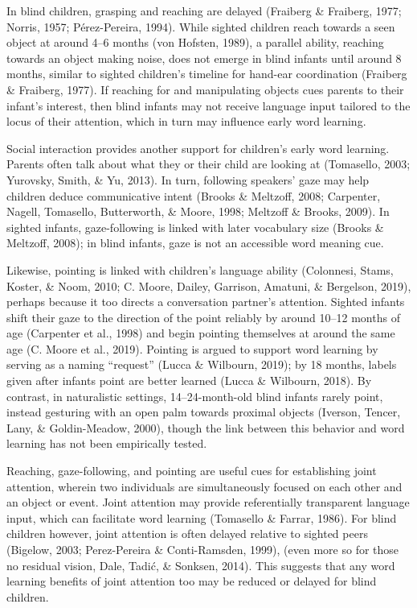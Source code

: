 \documentclass[
  man,floatsintext]{apa6}
\begin{document}
In blind children, grasping and reaching are delayed (Fraiberg \& Fraiberg, 1977; Norris, 1957; Pérez-Pereira, 1994). While sighted children reach towards a seen object at around 4--6 months (von Hofsten, 1989), a parallel ability, reaching towards an object making noise, does not emerge in blind infants until around 8 months, similar to sighted children's timeline for hand-ear coordination (Fraiberg \& Fraiberg, 1977). If reaching for and manipulating objects cues parents to their infant's interest, then blind infants may not receive language input tailored to the locus of their attention, which in turn may influence early word learning.

Social interaction provides another support for children's early word learning. Parents often talk about what they or their child are looking at (Tomasello, 2003; Yurovsky, Smith, \& Yu, 2013). In turn, following speakers' gaze may help children deduce communicative intent (Brooks \& Meltzoff, 2008; Carpenter, Nagell, Tomasello, Butterworth, \& Moore, 1998; Meltzoff \& Brooks, 2009). In sighted infants, gaze-following is linked with later vocabulary size (Brooks \& Meltzoff, 2008); in blind infants, gaze is not an accessible word meaning cue.

Likewise, pointing is linked with children's language ability (Colonnesi, Stams, Koster, \& Noom, 2010; C. Moore, Dailey, Garrison, Amatuni, \& Bergelson, 2019), perhaps because it too directs a conversation partner's attention. Sighted infants shift their gaze to the direction of the point reliably by around 10--12 months of age (Carpenter et al., 1998) and begin pointing themselves at around the same age (C. Moore et al., 2019). Pointing is argued to support word learning by serving as a naming ``request'' (Lucca \& Wilbourn, 2019); by 18 months, labels given after infants point are better learned (Lucca \& Wilbourn, 2018). By contrast, in naturalistic settings, 14--24-month-old blind infants rarely point, instead gesturing with an open palm towards proximal objects (Iverson, Tencer, Lany, \& Goldin-Meadow, 2000), though the link between this behavior and word learning has not been empirically tested.

Reaching, gaze-following, and pointing are useful cues for establishing joint attention, wherein two individuals are simultaneously focused on each other and an object or event. Joint attention may provide referentially transparent language input, which can facilitate word learning (Tomasello \& Farrar, 1986). For blind children however, joint attention is often delayed relative to sighted peers (Bigelow, 2003; Perez-Pereira \& Conti-Ramsden, 1999), (even more so for those no residual vision, Dale, Tadić, \& Sonksen, 2014). This suggests that any word learning benefits of joint attention too may be reduced or delayed for blind children.
\end{document}
